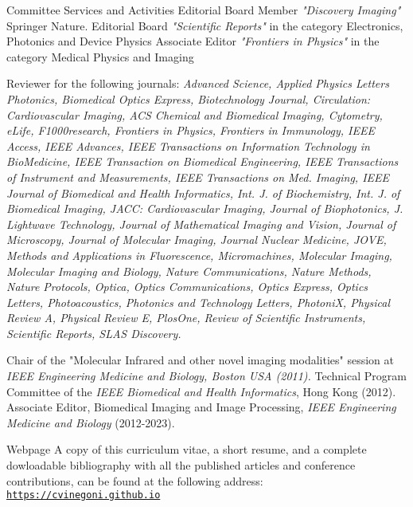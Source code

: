 \documentclass{resume}
\begin{document}
%
%
\begin{category}{Committee Services and Activities}
\citembullet 
Editorial Board Member {\it "Discovery Imaging"} Springer Nature.
\citembullet 
Editorial Board {\it "Scientific Reports"} in the category Electronics, Photonics and Device Physics
\citembullet 
Associate Editor {\it "Frontiers in Physics"} in the category Medical Physics and Imaging

\citembullet 
Reviewer for the following journals: {\it Advanced Science, Applied Physics Letters Photonics, Biomedical Optics Express, Biotechnology Journal, Circulation: Cardiovascular Imaging, ACS Chemical and Biomedical Imaging, Cytometry, eLife, F1000research, Frontiers in Physics, Frontiers in Immunology, IEEE Access, IEEE Advances, IEEE Transactions on Information Technology in BioMedicine,  IEEE Transaction on Biomedical Engineering, IEEE Transactions of Instrument and Measurements, IEEE Transactions on Med. Imaging,  IEEE Journal of Biomedical and Health Informatics, Int. J. of Biochemistry, Int. J. of Biomedical Imaging, JACC: Cardiovascular Imaging, Journal of Biophotonics, J. Lightwave Technology, Journal of Mathematical Imaging and Vision, Journal of Microscopy, Journal of Molecular Imaging, Journal Nuclear Medicine, JOVE,  Methods and Applications in Fluorescence, Micromachines, Molecular Imaging, Molecular Imaging and Biology, Nature Communications, Nature Methods, Nature Protocols, Optica, Optics Communications, Optics Express, Optics Letters, Photoacoustics, Photonics and Technology Letters, PhotoniX, Physical Review A, Physical Review E, PlosOne, Review of Scientific Instruments, Scientific Reports, SLAS Discovery.}

\citembullet 
Chair of the "Molecular Infrared and other novel imaging modalities" session at {\it IEEE Engineering Medicine and Biology, Boston USA (2011).}
\citembullet 
Technical Program Committee of the {\it IEEE Biomedical and Health Informatics}, Hong Kong (2012).
\citembullet 
Associate Editor, Biomedical Imaging and Image Processing, {\it IEEE Engineering Medicine and Biology} (2012-2023).
\end{category}

\begin{category}{Webpage}
 \citemnobullet 
A copy of this curriculum vitae, a short
resume, and a complete dowloadable bibliography with all the
published articles and conference contributions, can be found at the
following address:
\newline
    \mbox{\small\tt \url{https://cvinegoni.github.io}}
\end{category}
\end{document}
